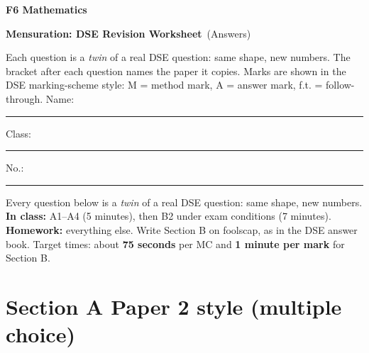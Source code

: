 \documentclass[11pt,addpoints]{exam}
\begin{document}
\hfill\textbf{F6 Mathematics}\par
\vspace{2pt}{\color{wyred}\rule{\linewidth}{1pt}}\par
{\LARGE\textbf{Mensuration: DSE Revision Worksheet}}\ifdefined\ANSWERS\ {\Large\color{wyred}(Answers)}\fi\par
\vspace{4pt}
\ifdefined\ANSWERS
Each question is a \emph{twin} of a real DSE question: same shape, new numbers. The bracket after each question names the paper it copies. Marks are shown in the DSE marking-scheme style: M = method mark, A = answer mark, f.t. = follow-through.
\else
Name: \rule{6cm}{0.4pt}\quad Class: \rule{1.5cm}{0.4pt}\quad No.: \rule{1.2cm}{0.4pt}

Every question below is a \emph{twin} of a real DSE question: same shape, new numbers.
\textbf{In class:} A1--A4 (5 minutes), then B2 under exam conditions (7 minutes).
\textbf{Homework:} everything else. Write Section B on foolscap, as in the DSE answer book. Target times: about \textbf{75 seconds} per MC and \textbf{1 minute per mark} for Section B.
\fi

\section*{Section A \quad Paper 2 style (multiple choice)}
\end{document}
